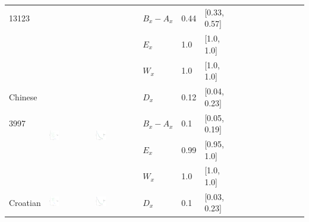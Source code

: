 \documentclass[11pt,letterpaper]{article}
\begin{document}
\begin{longtable}{lllllllllllllll}
13123  &    &    &  $B_x-A_x$  &  0.44  &  [0.33, 0.57]  \\ 
  &    &    &  $E_x$  &  1.0  &  [1.0, 1.0]  \\ 
  &    &    &  $W_x$  &  1.0  &  [1.0, 1.0]  \\ [10.25ex] \hline
Chinese  &  \multirow{4}{*}{\includegraphics[width=0.25\textwidth]{figures/Chinese-entropy-memory.pdf}}  &  \multirow{4}{*}{\includegraphics[width=0.25\textwidth]{figures/Chinese-listener-surprisal-memory.pdf}}  &  $D_x$  &  0.12  &  [0.04, 0.23]  \\ 
3997  &    &    &  $B_x-A_x$  &  0.1  &  [0.05, 0.19]  \\ 
  &    &    &  $E_x$  &  0.99  &  [0.95, 1.0]  \\ 
  &    &    &  $W_x$  &  1.0  &  [1.0, 1.0]  \\ [10.25ex] \hline
Croatian  &  \multirow{4}{*}{\includegraphics[width=0.25\textwidth]{figures/Croatian-entropy-memory.pdf}}  &  \multirow{4}{*}{\includegraphics[width=0.25\textwidth]{figures/Croatian-listener-surprisal-memory.pdf}}  &  $D_x$  &  0.1  &  [0.03, 0.23]  \\ 

\end{longtable}
\end{document}
